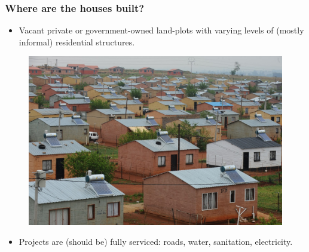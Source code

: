 \documentclass[aspectratio=32]{beamer}
\begin{document}

\begin{frame}
\frametitle{Where are the houses built?}

\begin{itemize}
  \item Vacant private or government-owned land-plots with varying levels of (mostly informal) residential structures. 
\end{itemize}

\begin{figure}
 \includegraphics[scale=.125]{figures/rdp_houses.jpg} 
\end{figure}

\begin{itemize}
  \item Projects are (should be) fully serviced: roads, water, sanitation, electricity.
\end{itemize}

\end{frame}


  
\end{document}

